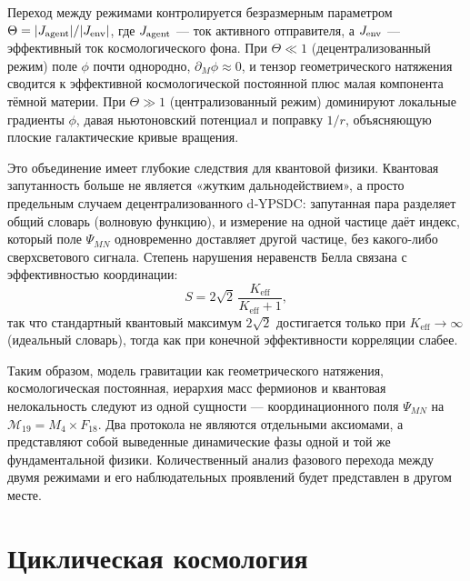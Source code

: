 \documentclass[12pt,a4paper]{article}
\begin{document}
	Переход между режимами контролируется безразмерным параметром \(\Theta = |J_{\rm agent}| / |J_{\rm env}|\), где \(J_{\rm agent}\) — ток активного отправителя, а \(J_{\rm env}\) — эффективный ток космологического фона. При \(\Theta\ll1\) (децентрализованный режим) поле \(\phi\) почти однородно, \(\partial_M\phi\approx0\), и тензор геометрического натяжения сводится к эффективной космологической постоянной плюс малая компонента тёмной материи. При \(\Theta\gg1\) (централизованный режим) доминируют локальные градиенты \(\phi\), давая ньютоновский потенциал и поправку \(1/r\), объясняющую плоские галактические кривые вращения.
	
	Это объединение имеет глубокие следствия для квантовой физики. Квантовая запутанность больше не является «жутким дальнодействием», а просто предельным случаем децентрализованного d‑YPSDC: запутанная пара разделяет общий словарь (волновую функцию), и измерение на одной частице даёт индекс, который поле \(\Psi_{MN}\) одновременно доставляет другой частице, без какого-либо сверхсветового сигнала. Степень нарушения неравенств Белла связана с эффективностью координации:
	\begin{equation}
		S = 2\sqrt{2}\,\frac{K_{\mathrm{eff}}}{K_{\mathrm{eff}}+1},
		\label{eq:bell-eff}
	\end{equation}
	так что стандартный квантовый максимум \(2\sqrt{2}\) достигается только при \(K_{\mathrm{eff}}\to\infty\) (идеальный словарь), тогда как при конечной эффективности корреляции слабее.
	
	Таким образом, модель гравитации как геометрического натяжения, космологическая постоянная, иерархия масс фермионов и квантовая нелокальность следуют из одной сущности — координационного поля \(\Psi_{MN}\) на \(\mathcal{M}_{19}=M_4\times F_{18}\). Два протокола не являются отдельными аксиомами, а представляют собой выведенные динамические фазы одной и той же фундаментальной физики. Количественный анализ фазового перехода между двумя режимами и его наблюдательных проявлений будет представлен в другом месте.
	
	\section{Циклическая космология}
	
\end{document}
